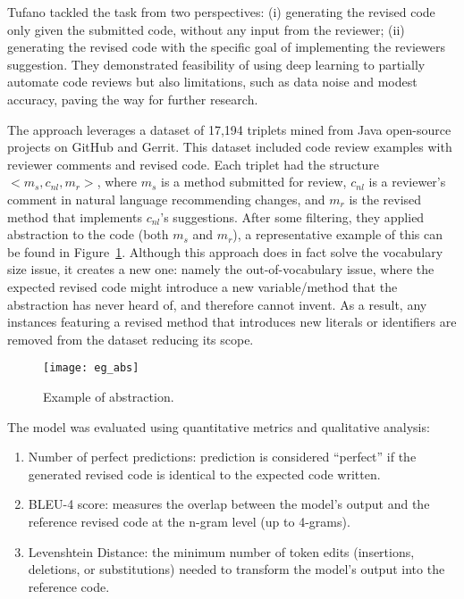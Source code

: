 Tufano \etal \cite{tufano:icse2021} tackled the task from two perspectives: (i)
generating the revised code only given the submitted code, \ie without any
input from the reviewer; (ii) generating the revised code with the specific
goal of implementing the reviewers suggestion. They demonstrated feasibility of
using deep learning to partially automate code reviews but also limitations,
such as data noise and modest accuracy, paving the way for further research.

The approach leverages a dataset of 17,194 triplets mined from Java open-source
projects on GitHub and Gerrit. This dataset included code review examples with
reviewer comments and revised code. Each triplet had the structure $<m_s,
	c_{nl}, m_r>$, where $m_s$ is a method submitted for review, $c_{nl}$ is a
reviewer’s comment in natural language recommending changes, and $m_r$ is the
revised method that implements $c_{nl}$’s suggestions.
After some filtering, they applied abstraction to the code (both $m_s$ and
$m_r$), a representative example of this can be found in
Figure~\ref{fig:abstraction}. Although this approach does in fact solve the
vocabulary size issue, it creates a new one: namely the out-of-vocabulary
issue, where the expected revised code might introduce a new variable/method
that the abstraction has never heard of, and therefore cannot invent. As a
result, any instances featuring a revised method that introduces new literals
or identifiers are removed from the dataset reducing its scope.

\begin{figure}[ht]
	\centering
	\texttt{[image: eg\_abs]}
	\caption{Example of abstraction.}
	\label{fig:abstraction}
	\vspace{-0.1cm}
\end{figure}

The model was evaluated using quantitative metrics and qualitative analysis:
\begin{enumerate}
	\item Number of perfect predictions: prediction is considered ``perfect'' if the
	      generated revised code is identical to the expected code written.
	\item BLEU-4 score: measures the overlap between the model's output and the reference
	      revised code at the n-gram level (up to 4-grams).
	\item Levenshtein Distance: the minimum number of token edits (insertions, deletions,
	      or substitutions) needed to transform the model's output into the reference
	      code.
\end{enumerate}


